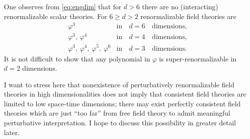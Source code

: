 One observes from \eqref{eq:engdim} that for $d>6$ there are no (interacting)
renormalizable scalar theories. For $6\ge d>2$ renormalizable field theories
are
\[
\begin{array}{ll}
\varphi^3 & \text{in}\quad d=6\quad\text{dimensions,}\\
\varphi^3,\ \varphi^4 & \text{in}\quad d=4\quad\text{dimensions,}\\
\varphi^3,\ \varphi^4,\ \varphi^5,\ \varphi^6 & \text{in}\quad d=3\quad\text{dimensions.}
\end{array}
\]
It is not difficult to show that any polynomial in $\varphi$ is
super-renormalizable in $d=2$ dimensions.

I want to stress here that nonexistence of perturbatively renormalizable field
theories in high dimensionalities does not imply that consistent field
theories are limited to low space-time dimensions; there may exist perfectly
consistent field theories which are just ``too far'' from free field theory to
admit meaningful perturbative interpretation. I hope to discuss this
possibility in greater detail later.
